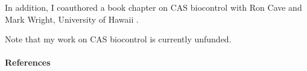 \begin{refsection}
In addition, I coauthored a book chapter on CAS biocontrol with Ron Cave and Mark Wright, University of Hawaii  \cite{cave_biological_2022}.

Note that my work on CAS biocontrol is currently unfunded.
\begin{comment}
\paragraph{Plans 15JUN2021-14JUN2022}

I am collaborating with the US Fish and Wildlife Service on prospects for CAS biocontrol. On my suggestion USFWS is considering funding a consulting trip to Guam by Dr. Ron Cave, a CAS biocontrol expert from the University of Florida.  

\paragraph{Plans 15JUN2022-14JUN2023}
I will work to help find funding to implement Dr. Cave's recommendations. 
\end{comment}
\paragraph{References}
\printbibliography[heading=none]

\end{refsection}

